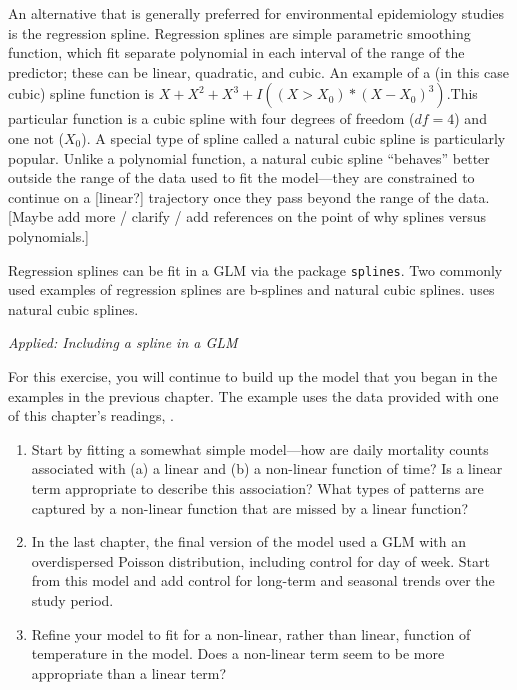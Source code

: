 \documentclass[
]{book}
\providecommand{\tightlist}{%
  \setlength{\itemsep}{0pt}\setlength{\parskip}{0pt}}
\begin{document}
An alternative that is generally preferred for environmental epidemiology
studies is the regression spline.
Regression splines are simple parametric smoothing function,
which fit separate polynomial in each interval of the range of the predictor; these
can be linear, quadratic, and cubic. An example of a (in this case cubic) spline
function is \(X+X^{2}+X^{3}+I((X>X_{0})*(X-X_{0})^3)\).This particular function is
a cubic spline with four degrees of freedom (\(df=4\)) and one not (\(X_{0}\)).
A special type of spline called a natural cubic spline is particularly popular.
Unlike a polynomial function, a natural cubic spline ``behaves'' better outside
the range of the data used to fit the model---they are constrained to continue
on a {[}linear?{]} trajectory once they pass beyond the range of the data.
{[}Maybe add more / clarify / add references on the point of why splines versus
polynomials.{]}

Regression splines can be fit in a GLM via the package \texttt{splines}. Two commonly
used examples of regression splines are b-splines and natural cubic
splines. \citet{vicedo2019hands} uses natural cubic splines.

\emph{Applied: Including a spline in a GLM}

For this exercise, you will continue to build up the model that you began in
the examples in the previous chapter. The example uses the data provided with
one of this chapter's readings, \citet{vicedo2019hands}.

\begin{enumerate}
\def\labelenumi{\arabic{enumi}.}
\tightlist
\item
  Start by fitting a somewhat simple model---how are daily mortality counts
  associated with (a) a linear and (b) a non-linear function of time? Is a linear
  term appropriate to describe this association? What types of patterns are
  captured by a non-linear function that are missed by a linear function?
\item
  In the last chapter, the final version of the model used a GLM with an
  overdispersed Poisson distribution, including control for day of week.
  Start from this model and add control for long-term and seasonal trends
  over the study period.
\item
  Refine your model to fit for a non-linear, rather than linear, function
  of temperature in the model. Does a non-linear term seem to be more
  appropriate than a linear term?
\end{enumerate}
\end{document}
